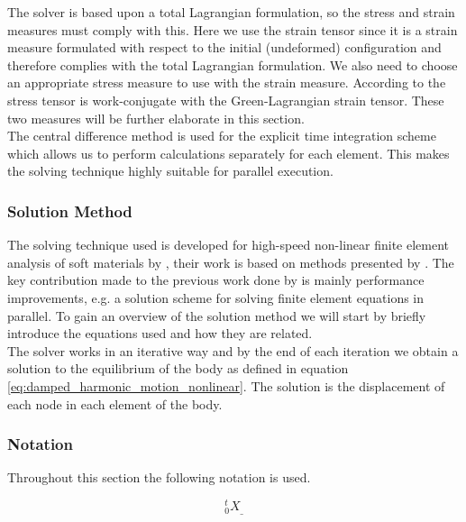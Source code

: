 The solver is based upon a total Lagrangian formulation, so the stress
and strain measures must comply with this. Here we use the
 strain tensor since it is a strain
measure formulated with respect to the initial (undeformed)
configuration and therefore complies with the total Lagrangian formulation.
We also need to choose an appropriate stress
measure to use with the strain measure. According to
 the  stress tensor
is work-conjugate with the Green-Lagrangian strain
tensor. These two measures will be further elaborate in
this section. \\

The central difference method is used for the explicit time
integration scheme which allows us to perform calculations
separately for each element. This makes the 
solving technique highly suitable for parallel execution. 

\subsubsection{Solution Method}
The solving technique used is developed for high-speed non-linear finite
element analysis of soft materials by , their work
is based on methods 
presented by . The key contribution made to the
previous work done by  is mainly performance
improvements, e.g. a solution scheme for
solving finite element equations in parallel. To gain an overview of
the solution method we will start by briefly introduce the
equations used and how they are related. \\

The solver works in an iterative way and
by the end of each iteration we obtain a solution to the equilibrium
of the body as defined in equation
\eqref{eq:damped_harmonic_motion_nonlinear}. The solution 
is the displacement of each node in each element of the body. \\

\subsubsection*{Notation}
Throughout this section the following notation is used.

\begin{equation}
\label{eq:notation}
^t_0X_{\_}
\end{equation}


